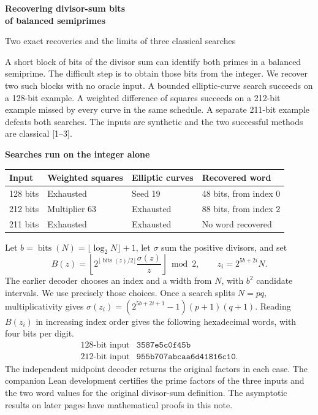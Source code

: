 \documentclass[12pt,letterpaper]{article}
\newcommand{\subh}[1]{{\sffamily\bfseries\color{accent}#1}\par}
\newcommand{\bits}{\operatorname{bits}}
\newcommand{\rs}[1]{\textup{[#1]}}
\begin{document}
\smallskip
{\huge\bfseries\color{ink}Recovering divisor-sum bits\\[2pt]of balanced semiprimes\par}
\vspace{4pt}
{\large\sffamily\color{accent}Two exact recoveries and the limits of three classical searches\par}
\vspace{9pt}
A short block of bits of the divisor sum can identify both primes in a balanced semiprime. The difficult step is to obtain those bits from the integer. We recover two such blocks with no oracle input. A bounded elliptic-curve search succeeds on a 128-bit example. A weighted difference of squares succeeds on a 212-bit example missed by every curve in the same schedule. A separate 211-bit example defeats both searches. The inputs are synthetic and the two successful methods are classical \rs{1--3}.

\subh{Searches run on the integer alone}
\begin{tabularx}{\linewidth}{@{}l l l X@{}}
\toprule
\textbf{Input} & \textbf{Weighted squares} & \textbf{Elliptic curves} & \textbf{Recovered word}\\
\midrule
128 bits & Exhausted & Seed 19 & 48 bits, from index 0\\
212 bits & Multiplier 63 & Exhausted & 88 bits, from index 2\\
211 bits & Exhausted & Exhausted & No word recovered\\
\bottomrule
\end{tabularx}

Let $b=\bits(N)=\lfloor\log_2 N\rfloor+1$, let $\sigma$ sum the positive divisors, and set
\[
 B(z)=\left\lfloor 2^{\lfloor\bits(z)/2\rfloor}\frac{\sigma(z)}{z}\right\rfloor\bmod 2,
 \qquad z_i=2^{5b+2i}N .
\]
The earlier decoder chooses an index and a width from $N$, with $b^2$ candidate intervals. We use precisely those choices. Once a search splits $N=pq$, multiplicativity gives $\sigma(z_i)=(2^{5b+2i+1}-1)(p+1)(q+1)$. Reading $B(z_i)$ in increasing index order gives the following hexadecimal words, with four bits per digit.
\[
\begin{array}{rl}
128\text{-bit input}&\texttt{3587e5c0f45b}\\
212\text{-bit input}&\texttt{955b707abcaa6d41816c10}.
\end{array}
\]
The independent midpoint decoder returns the original factors in each case. The companion Lean development certifies the prime factors of the three inputs and the two word values for the original divisor-sum definition. The asymptotic results on later pages have mathematical proofs in this note.
\end{document}
